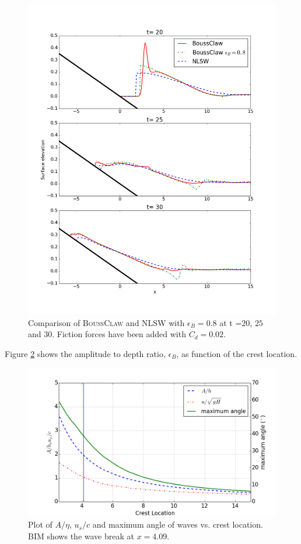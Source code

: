 \documentclass[review]{elsarticle}
\newcommand{\BoussClaw}{\textsc{BoussClaw} }
\begin{document}
\begin{figure}[tbh!]
\centering
\includegraphics[width=.8\textwidth]{_fig/bim_boussclaw_etaB8}
\caption{Comparison of \BoussClaw and NLSW 
with $\epsilon_B=0.8$ at t =$20$, $25$ and $30$.
Fiction forces have been added with $C_d=0.02$.}
\label{fig:boussclaw_th08}
\end{figure}

Figure \ref{fig:wave_break_criteria} shows 
the amplitude to depth ratio, $\epsilon_B$, as function of the crest location. 

\begin{figure}[tbh!]
\centering
\includegraphics[width=.7\textwidth]{_fig/wave_break}
\caption{Plot of $A/\eta$, $u_s/c$ and maximum angle of waves vs. crest location. 
BIM shows the wave break at $x=4.09$. }
\label{fig:wave_break_criteria}
\end{figure}
\end{document}
